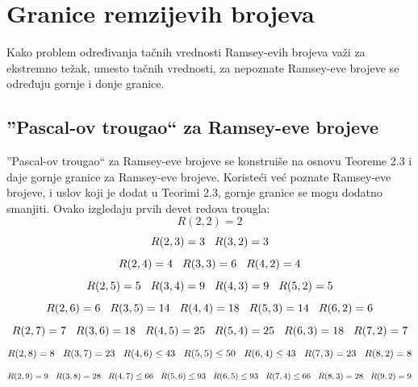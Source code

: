 \documentclass[12pt,a4paper]{article}
\begin{document}
	\section{Granice remzijevih brojeva}
	Kako problem određivanja tačnih vrednosti Ramsey-evih brojeva važi za ekstremno težak, umesto tačnih vrednosti, za nepoznate Ramsey-eve brojeve se određuju gornje i donje granice.
	\subsection{''Pascal-ov trougao`` za  Ramsey-eve brojeve}
	''Pascal-ov trougao`` za  Ramsey-eve brojeve se konstruiše na osnovu Teoreme 2.3 i daje gornje granice za Ramsey-eve brojeve. Koristeći već poznate Ramsey-eve brojeve, i uslov koji je dodat u Teorimi 2.3, gornje granice se mogu dodatno smanjiti.
	\vspace{0.2em}
	\noindent Ovako izgledaju prvih devet redova trougla:
	\vspace{2em}
	\tiny 
\[R(2,2)=2\]
\[R(2,3)=3\hspace{0.3cm}R(3,2)=3\]
\[R(2,4)=4\hspace{0.3cm}R(3,3)=6\hspace{0.3cm}R(4,2)=4\]
\[R(2,5)=5\hspace{0.3cm}R(3,4)=9\hspace{0.3cm}R(4,3)=9\hspace{0.3cm}R(5,2)=5\]
\[R(2,6)=6\hspace{0.3cm}R(3,5)=14\hspace{0.3cm}R(4,4)=18\hspace{0.3cm}R(5,3)=14\hspace{0.3cm}R(6,2)=6\]
\[R(2,7)=7\hspace{0.3cm}R(3,6)=18\hspace{0.3cm}R(4,5)=25\hspace{0.3cm}R(5,4)=25\hspace{0.3cm}R(6,3)=18\hspace{0.3cm}R(7,2)=7\]
\[R(2,8)=8\hspace{0.3cm}R(3,7)=23\hspace{0.3cm}R(4,6)\leq 43\hspace{0.3cm}R(5,5)\leq 50\hspace{0.3cm}R(6,4)\leq 43\hspace{0.3cm}R(7,3)=23\hspace{0.3cm}R(8,2)=8\]
\[R(2,9)=9\hspace{0.3cm}R(3,8)=28\hspace{0.3cm}R(4,7)\leq 66\hspace{0.3cm}R(5,6)\leq 93\hspace{0.3cm}R(6,5)\leq 93\hspace{0.3cm}R(7,4)\leq 66\hspace{0.3cm}R(8,3)=28\hspace{0.3cm}R(9,2)=9\]
\end{document}
